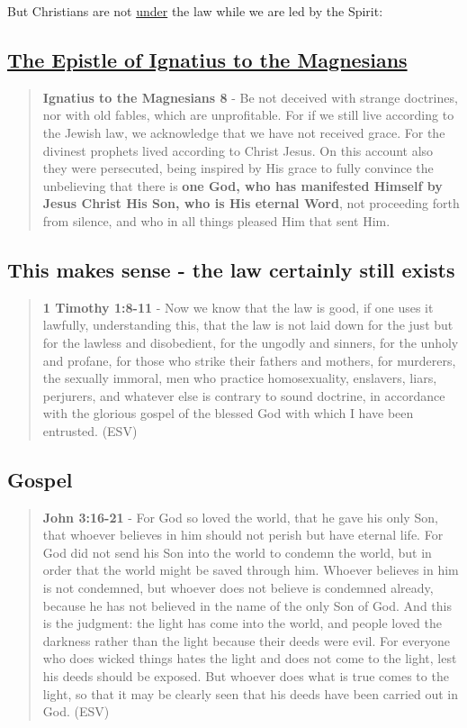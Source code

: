 \documentclass[11pt]{article}
\begin{document}
But Christians are not \uline{under} the law while we are led by the Spirit:

\subsection{\href{http://persweb.wabash.edu/facstaff/royaltyr/AncientCities/web/bradleyj/Project\%201/The\%20Epistle\%20of\%20Ignatius\%20to\%20the\%20Magnesians.htm}{The Epistle of Ignatius to the Magnesians}}
\label{sec:org668db40}

\begin{quote}
\textbf{Ignatius to the Magnesians 8} - Be not deceived with strange doctrines, nor with old fables, which are unprofitable. For if we still live according to the Jewish law, we acknowledge that we have not received grace. For the divinest prophets lived according to Christ Jesus. On this account also they were persecuted, being inspired by His grace to fully convince the unbelieving that there is \textbf{one God, who has manifested Himself by Jesus Christ His Son, who is His eternal Word}, not proceeding forth from silence, and who in all things pleased Him that sent Him.
\end{quote}

\subsection{This makes sense - the law certainly still exists}
\label{sec:orgb6611ed}
\begin{quote}
\textbf{1 Timothy 1:8-11} -  Now we know that the law is good, if one uses it lawfully, understanding this, that the law is not laid down for the just but for the lawless and disobedient, for the ungodly and sinners, for the unholy and profane, for those who strike their fathers and mothers, for murderers, the sexually immoral, men who practice homosexuality, enslavers, liars, perjurers, and whatever else is contrary to sound doctrine, in accordance with the glorious gospel of the blessed God with which I have been entrusted.  (ESV)
\end{quote}

\subsection{Gospel}
\label{sec:org58aca69}
\begin{quote}
\textbf{John 3:16-21} - For God so loved the world, that he gave his only Son, that whoever believes in him should not perish but have eternal life. For God did not send his Son into the world to condemn the world, but in order that the world might be saved through him. Whoever believes in him is not condemned, but whoever does not believe is condemned already, because he has not believed in the name of the only Son of God. And this is the judgment: the light has come into the world, and people loved the darkness rather than the light because their deeds were evil. For everyone who does wicked things hates the light and does not come to the light, lest his deeds should be exposed. But whoever does what is true comes to the light, so that it may be clearly seen that his deeds have been carried out in God. (ESV)
\end{quote}
\end{document}
